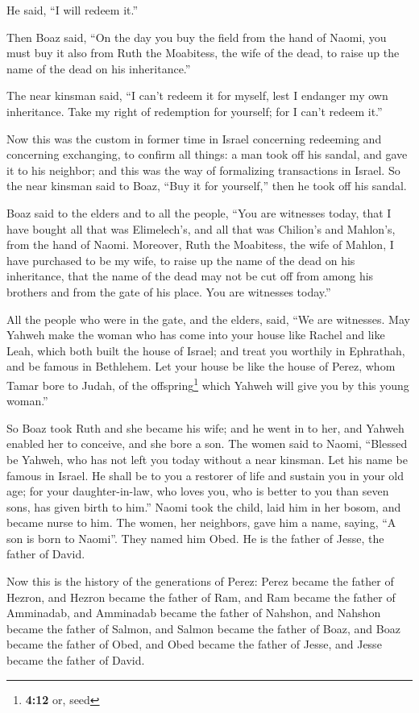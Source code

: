 He said, ``I will redeem it.''

 Then Boaz said, ``On the day you buy the field from the
hand of Naomi, you must buy it also from Ruth the Moabitess, the wife of
the dead, to raise up the name of the dead on his inheritance.''

 The near kinsman said, ``I can't redeem it for myself,
lest I endanger my own inheritance. Take my right of redemption for
yourself; for I can't redeem it.''

 Now this was the custom in former time in Israel
concerning redeeming and concerning exchanging, to confirm all things: a
man took off his sandal, and gave it to his neighbor; and this was the
way of formalizing transactions in Israel.  So the near
kinsman said to Boaz, ``Buy it for yourself,'' then he took off his
sandal.

 Boaz said to the elders and to all the people, ``You are
witnesses today, that I have bought all that was Elimelech's, and all
that was Chilion's and Mahlon's, from the hand of Naomi. 
Moreover, Ruth the Moabitess, the wife of Mahlon, I have purchased to be
my wife, to raise up the name of the dead on his inheritance, that the
name of the dead may not be cut off from among his brothers and from the
gate of his place. You are witnesses today.''

 All the people who were in the gate, and the elders,
said, ``We are witnesses. May Yahweh make the woman who has come into
your house like Rachel and like Leah, which both built the house of
Israel; and treat you worthily in Ephrathah, and be famous in Bethlehem.
 Let your house be like the house of Perez, whom Tamar
bore to Judah, of the offspring\footnote{\textbf{4:12} or, seed} which
Yahweh will give you by this young woman.''

 So Boaz took Ruth and she became his wife; and he went
in to her, and Yahweh enabled her to conceive, and she bore a son.
 The women said to Naomi, ``Blessed be Yahweh, who has
not left you today without a near kinsman. Let his name be famous in
Israel.  He shall be to you a restorer of life and
sustain you in your old age; for your daughter-in-law, who loves you,
who is better to you than seven sons, has given birth to him.''
 Naomi took the child, laid him in her bosom, and became
nurse to him.  The women, her neighbors, gave him a name,
saying, ``A son is born to Naomi''. They named him Obed. He is the
father of Jesse, the father of David.

 Now this is the history of the generations of Perez:
Perez became the father of Hezron,  and Hezron became the
father of Ram, and Ram became the father of Amminadab, 
and Amminadab became the father of Nahshon, and Nahshon became the
father of Salmon,  and Salmon became the father of Boaz,
and Boaz became the father of Obed,  and Obed became the
father of Jesse, and Jesse became the father of David.
